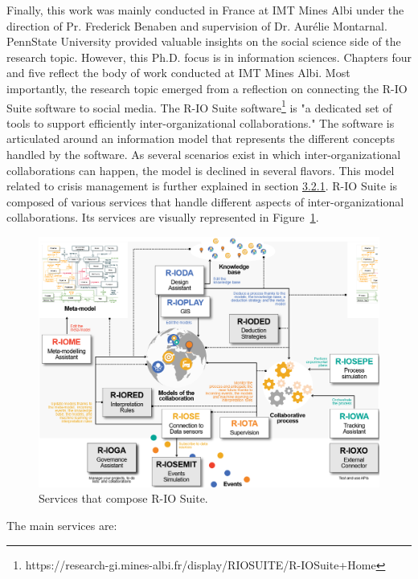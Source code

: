 Finally, this work was mainly conducted in France at IMT Mines Albi under the direction of Pr. Frederick Benaben and supervision of Dr. Aurélie Montarnal.
PennState University provided valuable insights on the social science side of the research topic.
However, this Ph.D. focus is in information sciences.
Chapters four and five reflect the body of work conducted at IMT Mines Albi.
Most importantly, the research topic emerged from a reflection on connecting the R-IO Suite software to social media.
The R-IO Suite software\footnote{https://research-gi.mines-albi.fr/display/RIOSUITE/R-IOSuite+Home} is "a dedicated set of tools to support efficiently inter-organizational collaborations."
The software is articulated around an information model that represents the different concepts handled by the software.
As several scenarios exist in which inter-organizational collaborations can happen, the model is declined in several flavors.
This model related to crisis management is further explained in section \hyperref[sec:crisismetamodel]{3.2.1}.
R-IO Suite is composed of various services that handle different aspects of inter-organizational collaborations.
Its services are visually represented in Figure~\ref{context:rio-services}.

\begin{figure}[htb]
    \centering
    \includegraphics[width=\textwidth,keepaspectratio]{figures/chap-1/rio-services.png}
    \caption{Services that compose R-IO Suite.}
    \label{context:rio-services}
\end{figure}

The main services are:


